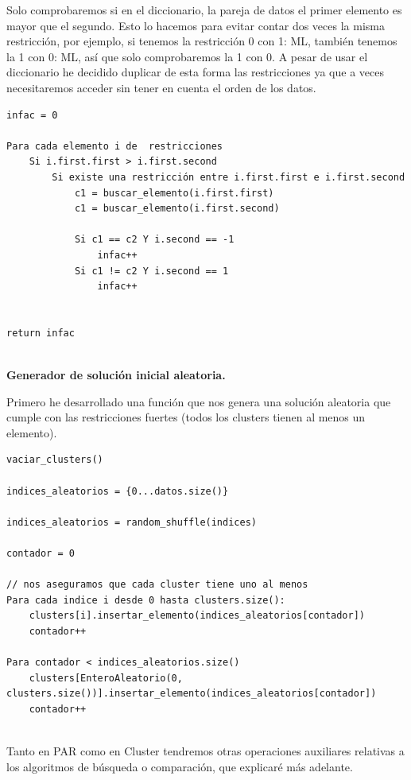 \documentclass[12pt, spanish]{article}
\begin{document}
Solo comprobaremos si en el diccionario, la pareja de datos el primer elemento es mayor que el segundo. Esto lo hacemos para evitar contar dos veces la misma restricción, por ejemplo, si tenemos la restricción 0 con 1: ML, también tenemos la 1 con 0: ML, así que solo comprobaremos la 1 con 0. A pesar de usar el diccionario he decidido duplicar de esta forma las restricciones ya que a veces necesitaremos acceder sin tener en cuenta el orden de los datos.

\newpage

\begin{lstlisting}
infac = 0

Para cada elemento i de  restricciones
	Si i.first.first > i.first.second
		Si existe una restricción entre i.first.first e i.first.second
			c1 = buscar_elemento(i.first.first)
			c1 = buscar_elemento(i.first.second)

			Si c1 == c2 Y i.second == -1
				infac++
			Si c1 != c2 Y i.second == 1
				infac++


return infac


\end{lstlisting}



 \textbf{Generador de solución inicial aleatoria.}

 Primero he desarrollado una función que nos genera una solución aleatoria que cumple con las restricciones fuertes (todos los clusters tienen al menos un elemento).

 \begin{lstlisting}
vaciar_clusters()

indices_aleatorios = {0...datos.size()}

indices_aleatorios = random_shuffle(indices)

contador = 0

// nos aseguramos que cada cluster tiene uno al menos
Para cada indice i desde 0 hasta clusters.size():
	clusters[i].insertar_elemento(indices_aleatorios[contador])
	contador++

Para contador < indices_aleatorios.size()
	clusters[EnteroAleatorio(0, clusters.size())].insertar_elemento(indices_aleatorios[contador])
	contador++


\end{lstlisting}



Tanto en PAR como en Cluster tendremos otras operaciones auxiliares relativas a los algoritmos de búsqueda o comparación, que explicaré más adelante.
\end{document}
